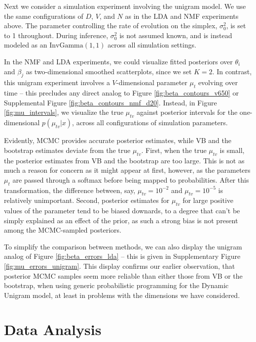 Next we consider a simulation experiment involving the unigram model. We use the
same configurations of $D$, $V$, and $N$ as in the LDA and NMF experiments
above. The parameter controlling the rate of evolution on the simplex,
$\sigma_{0}^2$, is set to 1 throughout. During inference, $\sigma_0^2$ is not
assumed known, and is instead modeled as an $\text{InvGamma}\left(1, 1\right)$
across all simulation settings.

In the NMF and LDA experiments, we could visualize fitted posteriors over
$\theta_i$ and $\beta_j$ as two-dimensional smoothed scatterplots, since we set
$K = 2$. In contrast, this unigram experiment involves a $V$-dimensional
parameter $\mu_t$ evolving over time -- this precludes any direct analog to
Figure \ref{fig:beta_contours_v650} or Supplemental Figure
\ref{fig:beta_contours_nmf_d20}. Instead, in Figure \ref{fig:mu_intervals}, we
visualize the true $\mu_{tv}$ against posterior intervals for the
one-dimensional $p\left(\mu_{tv} \vert x\right)$, across all configurations of
simulation parameters.

Evidently, MCMC provides accurate posterior estimates, while VB and the
bootstrap estimates deviate from the true $\mu_{tv}$. First, when the true
$\mu_{tv}$ is small, the posterior estimates from VB and the bootstrap are too
large. This is not as much a reason for concern as it might appear at first,
however, as the parameters $\mu_t$ are passed through a softmax before being
mapped to probabilities. After this transformation, the difference between, say,
$\mu_{tv} = 10^{-2}$ and $\mu_{tv} = 10^{-5}$ is relatively unimportant. Second,
posterior estimates for $\mu_{tv}$ for large positive values of the parameter
tend to be biased downards, to a degree that can't be simply explained as an
effect of the prior, as such a strong bias is not present among the MCMC-sampled
posteriors.

To simplify the comparison between methods, we can also display the unigram
analog of Figure \ref{fig:beta_errors_lda} -- this is given in Supplementary
Figure \ref{fig:mu_errors_unigram}. This display confirms our earlier
observation, that posterior MCMC samples seem more reliable than either those
from VB or the bootstrap, when using generic probabilistic programming for the
Dynamic Unigram model, at least in problems with the dimensions we have
considered.

\section{Data Analysis}
\label{sec:data_analysis}

